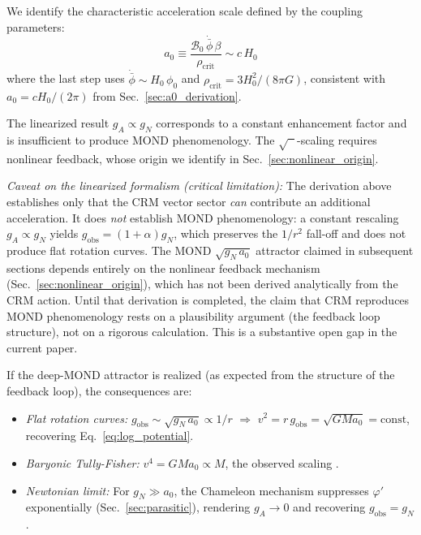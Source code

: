 \documentclass[aps,prd,twocolumn,superscriptaddress,nofootinbib]{revtex4-2}
\begin{document}
We identify the characteristic acceleration scale defined by the coupling parameters:
\begin{equation}
a_0 \equiv \frac{\mathcal{B}_0\,\dot{\bar{\phi}}\,\beta}{\rho_{\mathrm{crit}}} \sim c\,H_0
\label{eq:a0_from_eom}
\end{equation}
where the last step uses $\dot{\bar{\phi}} \sim H_0\,\phi_0$ and $\rho_{\mathrm{crit}} = 3H_0^2/(8\pi G)$, consistent with $a_0 = cH_0/(2\pi)$ from Sec.~\ref{sec:a0_derivation}.

The linearized result $g_A \propto g_N$ corresponds to a constant enhancement factor and is insufficient to produce MOND phenomenology. The $\sqrt{\phantom{x}}$-scaling requires nonlinear feedback, whose origin we identify in Sec.~\ref{sec:nonlinear_origin}.

\textit{Caveat on the linearized formalism (critical limitation):} The derivation above establishes only that the CRM vector sector \emph{can} contribute an additional acceleration. It does \emph{not} establish MOND phenomenology: a constant rescaling $g_A \propto g_N$ yields $g_\mathrm{obs} = (1+\alpha)g_N$, which preserves the $1/r^2$ fall-off and does not produce flat rotation curves. The MOND $\sqrt{g_N\,a_0}$ attractor claimed in subsequent sections depends entirely on the nonlinear feedback mechanism (Sec.~\ref{sec:nonlinear_origin}), which has not been derived analytically from the CRM action. Until that derivation is completed, the claim that CRM reproduces MOND phenomenology rests on a plausibility argument (the feedback loop structure), not on a rigorous calculation. This is a substantive open gap in the current paper.

If the deep-MOND attractor is realized (as expected from the structure of the feedback loop), the consequences are:
\begin{itemize}
\item \textit{Flat rotation curves:} $g_{\mathrm{obs}} \sim \sqrt{g_N\,a_0} \propto 1/r$ $\Rightarrow$ $v^2 = r\,g_{\mathrm{obs}} = \sqrt{GMa_0} = \mathrm{const}$, recovering Eq.~\eqref{eq:log_potential}.
\item \textit{Baryonic Tully-Fisher:} $v^4 = GMa_0 \propto M$, the observed scaling \cite{McGaugh2012}.
\item \textit{Newtonian limit:} For $g_N \gg a_0$, the Chameleon mechanism suppresses $\varphi'$ exponentially (Sec.~\ref{sec:parasitic}), rendering $g_A \to 0$ and recovering $g_{\mathrm{obs}} = g_N$.
\end{itemize}
\end{document}
